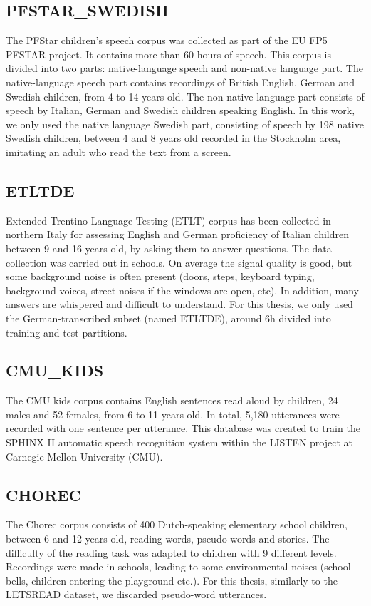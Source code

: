 \subsection{PFSTAR\_SWEDISH}
The PFStar children's speech corpus \cite{pfstar} was collected as part of the EU FP5 PFSTAR project. It contains more than 60 hours of speech. This corpus is divided into two parts: native-language speech and non-native language part.
The native-language speech part contains recordings of British English, German and Swedish children, from 4 to 14 years old. The non-native language part consists of speech by Italian, German and Swedish children speaking English. In this work, we only used the native language Swedish part, consisting of speech by 198 native Swedish children, between 4 and 8 years old recorded in the Stockholm area, imitating an adult who read the text from a screen.
\subsection{ETLTDE}
Extended Trentino Language Testing (ETLT) corpus \cite{etlt} has been collected in northern Italy for assessing English and German proficiency of Italian children between 9 and 16 years old, by asking them to answer questions. The data collection was carried out in schools. On average the signal quality is good, but some background noise is often present (doors, steps, keyboard typing, background voices, street noises if the windows are open, etc). In addition, many answers are whispered and difficult to understand.
For this thesis, we only used the German-transcribed subset (named ETLTDE), around 6h divided into training and test partitions.
\subsection{CMU\_KIDS}
The CMU kids corpus \cite{cmu} contains English sentences read aloud by children, 24 males and 52 females, from 6 to 11 years old. In total, 5,180 utterances were recorded with one sentence per utterance. This database was created to train the SPHINX II \cite{sphinx2} automatic speech recognition system within the LISTEN project at Carnegie Mellon University (CMU).
\subsection{CHOREC}
\label{subsection:chorec}
The Chorec corpus \cite{chorec} consists of 400 Dutch-speaking elementary school children, between 6 and 12 years old, reading words, pseudo-words and stories. The difficulty of the reading task was adapted to children with 9 different levels. Recordings were made in schools, leading to some environmental noises (school bells, children entering the playground etc.). For this thesis, similarly to the LETSREAD dataset, we discarded pseudo-word utterances.

